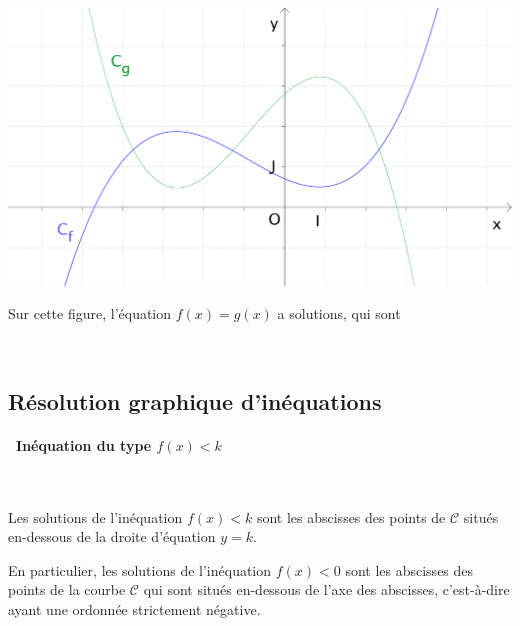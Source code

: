 \pagebreak[4]

\noindent
{} \\[1em]

\begin{minipage}[c]{0.5\linewidth}
  \includegraphics[width=\textwidth]{F_resineq_fg.pdf}
\end{minipage}
\qquad
\begin{minipage}[t]{0.4\linewidth}
  Sur cette figure, l'équation $f(x)=g(x)$ a \hspace{1cm} solutions,
  qui sont
\end{minipage} \\[1em]



\subsection{Résolution graphique d'inéquations}

\paragraph{\textbullet \ Inéquation du type $f(x)<k$} \ \par
Les solutions de l'inéquation $f(x)<k$ sont les abscisses des points
de $\mathscr{C}$ situés en-dessous de la droite d'équation $y=k$.

En particulier, les solutions de l'inéquation $f(x)<0$ sont les
abscisses des points de la courbe $\mathscr{C}$ qui sont situés
en-dessous de l'axe des abscisses, c'est-à-dire ayant une ordonnée
strictement négative.\\

